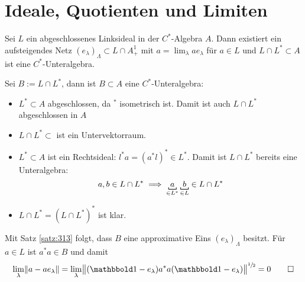\section{Ideale, Quotienten und Limiten} %
\label{sec:4}

\begin{proposition}[{name=[aus abgeschlossenem Ideal eine $C^*$-Unteralgebra bauen]},label=prop:41]
	Sei $L$ ein abgeschlossenes Linksideal in der $C^*$-Algebra $A$.
	Dann existiert ein aufsteigendes Netz $(e_\lambda)_\Lambda \subset L \cap A_+^1$ mit $a =\lim_\lambda a e_\lambda$ für $a \in L$ und $L \cap L^* \subset A$ ist eine $C^*$-Unteralgebra.
\end{proposition}
\begin{beweis}
	Sei $B := L \cap L^*$, dann ist $B \subset A$ eine $C^*$-Unteralgebra:
	\begin{itemize}[itemsep=0pt]
		\item $L^* \subset A$ abgeschlossen, da $^*$ isometrisch ist. Damit ist auch $L \cap L^*$ abgeschlossen in $A$
		\item $L \cap L^* \subset$ ist ein Untervektorraum.
		\item $L^* \subset A$ ist ein Rechtsideal: $l^* a = (a^*l)^* \in L^*$. Damit ist $L \cap L^*$ bereits eine Unteralgebra: 
		\[
			a,b \in L \cap L^* \implies \Underbracket{\minwidthbox{a}{1em}}{\in L^*} \, \Underbracket{\minwidthbox{b}{1em}}{\in L} \in L \cap L^*
		\]
		\item $L \cap L^* = (L \cap L^*)^*$ ist klar.
	\end{itemize}
	Mit Satz \autoref{satz:313} folgt, dass $B$ eine approximative Eins $(e_\lambda)_\Lambda$ besitzt. 
	Für $a \in L$ ist $a^*a \in B$ und damit 
	\[
		\lim_\lambda \norm*{a-a e_\lambda}  = \lim_\lambda \norm[\big]{(\ind-e_\lambda)a^* a(\ind-e_\lambda)}^{\sfrac{1}{2}} =0 \qedhere
	\]
\end{beweis}

